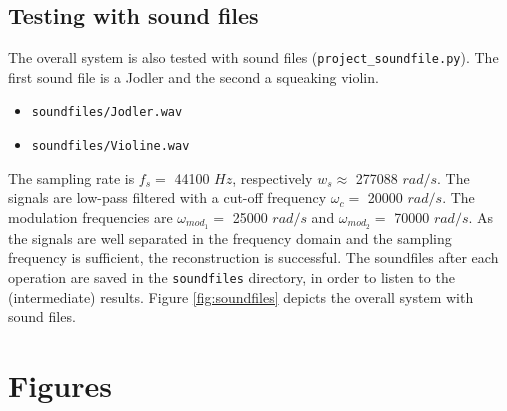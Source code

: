 \documentclass[12pt, a4paper]{report}
\begin{document}
\section{Testing with sound files}

The overall system is also tested with sound files (\texttt{project\_soundfile.py}). The first sound file is a Jodler and the second a squeaking violin.
\begin{itemize}
	\item \texttt{soundfiles/Jodler.wav}
	\item \texttt{soundfiles/Violine.wav}
\end{itemize}
The sampling rate is \(f_s=\) 44100 \(Hz\), respectively \(w_s\approx\) 277088 \(rad/s\). The signals are low-pass filtered with a cut-off frequency \(\omega_c=\) 20000 \(rad/s\). The modulation frequencies are \(\omega_{mod_1}=\) 25000 \(rad/s\) and \(\omega_{mod_2}=\) 70000 \(rad/s\). As the signals are well separated in the frequency domain and the sampling frequency is sufficient,
the reconstruction is successful. The soundfiles after each operation are saved in the \texttt{soundfiles} directory, in order to listen to the (intermediate) results. Figure \ref{fig:soundfiles} depicts the overall system with sound files.

\appendix

\chapter{Figures}
\setcounter{page}{3}
\end{document}
